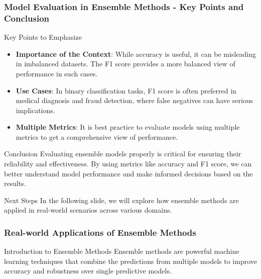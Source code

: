 \documentclass[aspectratio=169]{beamer}
\begin{document}
\begin{frame}[fragile]
    \frametitle{Model Evaluation in Ensemble Methods - Key Points and Conclusion}
    \begin{block}{Key Points to Emphasize}
        \begin{itemize}
            \item \textbf{Importance of the Context}: While accuracy is useful, it can be misleading in imbalanced datasets. The F1 score provides a more balanced view of performance in such cases.
            \item \textbf{Use Cases}: In binary classification tasks, F1 score is often preferred in medical diagnosis and fraud detection, where false negatives can have serious implications.
            \item \textbf{Multiple Metrics}: It is best practice to evaluate models using multiple metrics to get a comprehensive view of performance.
        \end{itemize}
    \end{block}

    \begin{block}{Conclusion}
        Evaluating ensemble models properly is critical for ensuring their reliability and effectiveness. By using metrics like accuracy and F1 score, we can better understand model performance and make informed decisions based on the results.
    \end{block}

    \begin{block}{Next Steps}
        In the following slide, we will explore how ensemble methods are applied in real-world scenarios across various domains.
    \end{block}
\end{frame}

\begin{frame}[fragile]
  \frametitle{Real-world Applications of Ensemble Methods}
  \begin{block}{Introduction to Ensemble Methods}
    Ensemble methods are powerful machine learning techniques that combine the predictions from multiple models to improve accuracy and robustness over single predictive models.
  \end{block}
\end{frame}
\end{document}
